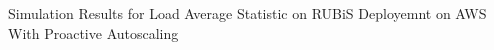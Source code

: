 \label{proactive} Simulation Results for Load Average Statistic on RUBiS Deployemnt on AWS With Proactive Autoscaling